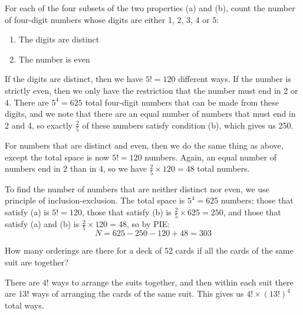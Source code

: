 \documentclass[10pt]{article}
\begin{document}
	\begin{problem}
		For each of the four subsets of the two properties (a) and (b), count the number of four-digit
		numbers whose digits are either 1, 2, 3, 4 or 5:

		\begin{enumerate}[label=(\alph*)]
			\item The digits are distinct
			\item The number is even
		\end{enumerate}

		\begin{solution}
			If the digits are distinct, then we have \( 5! = 120 \) different ways. If the number is strictly
			even, then we only have the restriction that the number must end in 2 or 4. There are \( 5^{4} =
			625 \) total four-digit numbers that can be made from these digits, and we note that there are an
			equal number of numbers that must end in 2 and 4, so exactly \( \frac{2}{5} \) of these numbers
			satisfy condition (b), which gives us 250.

			For numbers that are distinct and even, then we do the same thing as above, except the total
			space is now \( 5! = 120 \) numbers. Again, an equal number of numbers end in 2 than in 4, so we
			have \( \frac{2}{5} \times 120 = 48 \) total numbers. 

			To find the number of numbers that are neither distinct nor even, we use principle of
			inclusion-exclusion. The total space is \( 5^{4} = 625 \) numbers; those that satisfy (a) is \(
			5! = 120 \), those that satisfy (b) is \( \frac{2}{5} \times 625 = 250 \), and those that satisfy
			(a) and (b) is \( \frac{2}{5} \times 120 = 48 \), so by PIE:
			\[
				N = 625 - 250 - 120 + 48 = 303
			\]
		\end{solution}
	\end{problem}

	\begin{problem}
		How many orderings are there for a deck of 52 cards if all the cards of the same suit are together? 
	\end{problem}

	\begin{solution}
		There are \( 4! \) ways to arrange the suits together, and then within each suit there are \( 13! \)
		ways of arranging the cards of the same suit. This gives us \( 4! \times (13!)^{4} \) total ways.   
	\end{solution}
\end{document}
